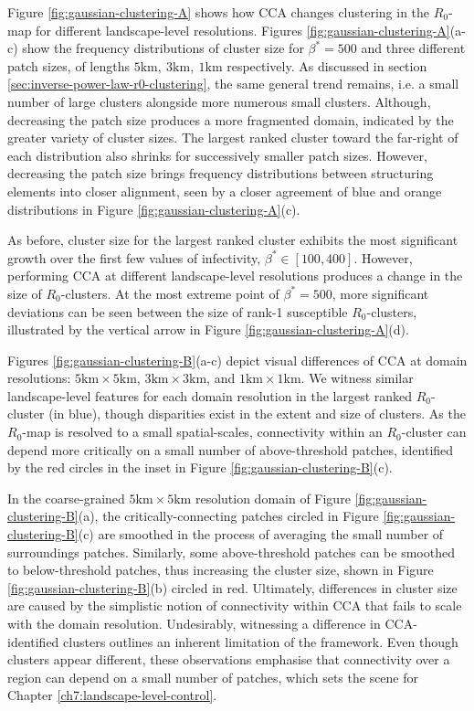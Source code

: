 Figure \ref{fig:gaussian-clustering-A} shows how CCA changes clustering in the $R_0$-map for different landscape-level resolutions.
Figures \ref{fig:gaussian-clustering-A}(a-c) show the frequency distributions of cluster size for $\beta^*=500$ and three different patch sizes, of lengths $\mathrm{5km,\ 3km,\ 1km}$ respectively.
As discussed in section \ref{sec:inverse-power-law-r0-clustering}, the same general trend remains, i.e. a small number of large clusters alongside more numerous small clusters.
Although, decreasing the patch size produces a more fragmented domain, indicated by the greater variety of cluster sizes.
The largest ranked cluster toward the far-right of each distribution also shrinks for successively smaller patch sizes.
However, decreasing the patch size brings frequency distributions between structuring elements into closer alignment, seen by a closer agreement of blue and orange distributions in Figure \ref{fig:gaussian-clustering-A}(c).

As before, cluster size for the largest ranked cluster exhibits the most significant growth over the first few values of infectivity, 
$\beta^* \in [100, 400]$. However, performing CCA at different landscape-level resolutions produces a change in the size of $R_0$-clusters.
At the most extreme point of $\beta^*=500$, more significant deviations can be seen between the size of rank-1 susceptible $R_0$-clusters,
illustrated by the vertical arrow in Figure \ref{fig:gaussian-clustering-A}(d).

Figures \ref{fig:gaussian-clustering-B}(a-c) depict visual differences of CCA at domain resolutions: $\mathrm{5km \times 5km}$, 
$\mathrm{3km\times 3km}$, and $\mathrm{1km\times 1km}$.
We witness similar landscape-level features for each domain resolution in the largest ranked $R_0$-cluster (in blue), 
though disparities exist in the extent and size of clusters. As the $R_0$-map is resolved to a small spatial-scales, 
connectivity within an $R_0$-cluster can depend more critically on a small number of above-threshold patches, 
identified by the red circles in the inset in Figure \ref{fig:gaussian-clustering-B}(c).

In the coarse-grained $\mathrm{5km\times 5km}$ resolution domain of Figure \ref{fig:gaussian-clustering-B}(a), 
the critically-connecting patches circled in Figure \ref{fig:gaussian-clustering-B}(c) are smoothed in the process of averaging the small number of surroundings patches. 
Similarly, some above-threshold patches can be smoothed to below-threshold patches, thus increasing the cluster size, shown in Figure \ref{fig:gaussian-clustering-B}(b) circled in red.
Ultimately, differences in cluster size are caused by the simplistic notion of connectivity within CCA that fails to scale with the domain resolution.
Undesirably, witnessing a difference in CCA-identified clusters outlines an inherent limitation of the framework.
Even though clusters appear different, these observations emphasise that connectivity over a region can depend on a small number of patches, 
which sets the scene for Chapter \ref{ch7:landscape-level-control}.

